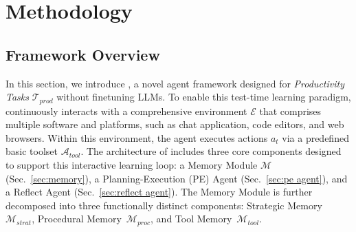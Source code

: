 \section{Methodology}

\subsection{Framework Overview}

In this section, we introduce {\method}, a novel agent framework designed for \textit{Productivity Tasks} $\mathcal{T}_{prod}$ without finetuning LLMs.
To enable this test-time learning paradigm, {\method} continuously interacts with a comprehensive environment $\mathcal{E}$ that comprises multiple software and platforms, such as chat application, code editors, and web browsers. Within this environment, the agent executes actions $a_t$ via a predefined basic toolset $\mathcal{A}_{tool}$. The architecture of {\method} includes three core components designed to support this interactive learning loop: a Memory Module $\mathcal{M}$ (Sec.~\ref{sec:memory}), a Planning-Execution (PE) Agent (Sec.~\ref{sec:pe agent}), and a Reflect Agent (Sec.~\ref{sec:reflect agent}). The Memory Module is further decomposed into three functionally distinct components: Strategic Memory~$\mathcal{M}_{strat}$, Procedural Memory~$\mathcal{M}_{proc}$, and Tool Memory~$\mathcal{M}_{tool}$.


